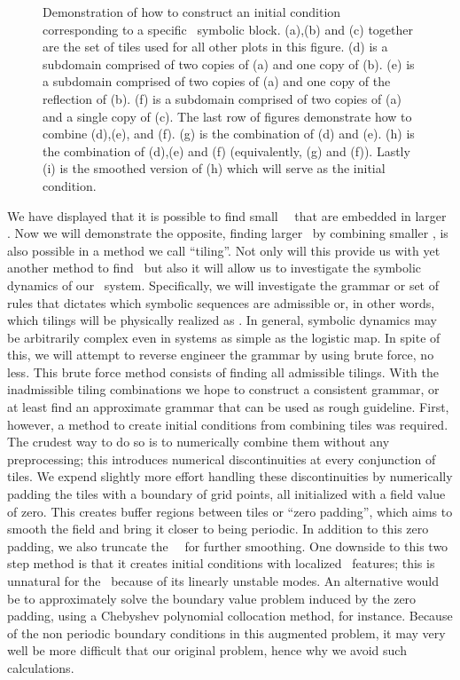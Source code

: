 \begin{figure}
\caption{ \label{fig:tilingschematic}
Demonstration of how to construct an initial condition corresponding to a specific
\spt\ symbolic block. (a),(b) and (c) together are the set of tiles used for all
other plots in this figure. (d) is a subdomain comprised of two copies of (a) and one copy of (b). (e) is a subdomain comprised of two copies of (a) and one copy of
the reflection of (b). (f) is a subdomain comprised of two copies of (a) and a
single copy of (c). The last row of figures demonstrate how to combine (d),(e),
and (f). (g) is the combination of (d) and (e). (h) is the combination of (d),(e)
and (f) (equivalently, (g) and (f)). Lastly (i) is the smoothed version of (h) which will serve as the initial condition.
}
\end{figure}
We have displayed that it is possible to find small \spt\ \twots\ that
are embedded in larger \twots.
Now we will demonstrate the opposite,
finding larger \twots\ by combining smaller \twots, is also possible in a method we
call ``tiling''. Not only will this provide us with yet another
method to find \twots\ but also it will allow us to investigate
the symbolic dynamics of our \spt\ system.
Specifically, we will investigate the grammar
 or set of rules that dictates
which symbolic sequences are admissible or, in other words, which tilings will
be physically realized as \twots. In general, symbolic dynamics may be
arbitrarily complex even in systems as simple as the logistic map.
In spite of this, we will attempt to reverse engineer the grammar
by using brute force, no less. This brute force method consists of
finding all admissible tilings. With the inadmissible tiling combinations
we hope to construct a consistent grammar, or at least find an approximate
grammar that can be used as rough guideline.
First, however, a method to create initial conditions from combining
tiles was required.
The crudest way to do so is to numerically
combine them without any preprocessing; this introduces numerical discontinuities
at every conjunction of tiles.
We expend slightly more effort handling these discontinuities
by numerically padding the tiles with a boundary of grid points, all
initialized with a field value of zero. This creates buffer regions between
tiles or ``zero padding'', which aims to smooth the field and
bring it closer to being periodic.
In addition
to this zero padding, we also truncate the \spt\ \Fcs\ for further smoothing.
One downside to this two step method is that it
creates initial conditions with localized \spt\ features;
this is unnatural for the \KSe\ because of its linearly unstable modes.
An alternative would be to approximately solve the boundary value problem
induced by the zero padding, using a Chebyshev polynomial
collocation method, for instance. Because of the non periodic
boundary conditions in this augmented problem,
it may very well be more difficult that our original problem, hence
why we avoid such calculations.

